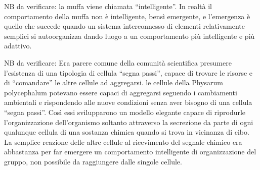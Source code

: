 NB da verificare: la muffa viene chiamata “intelligente”. In realtà il comportamento della muffa non è intelligente, bensì emergente, e l’emergenza è quello che succede quando un sistema interconnesso di elementi relativamente semplici si autoorganizza dando luogo a un comportamento più intelligente e più adattivo.

NB da verificare: Era parere comune della comunità scientifica presumere l’esistenza di una tipologia di cellula “segna passi”, capace di trovare le risorse e di “comandare” le altre cellule ad aggregarsi. le cellule della Physarum polycephalum potevano essere capaci di aggregarsi seguendo i cambiamenti ambientali e rispondendo alle nuove condizioni senza aver bisogno di una cellula “segna passi”. Così essi svilupparono un modello elegante capace di riprodurle l’organizzazione dell’organismo soltanto attraverso la secrezione da parte di ogni qualunque cellula di una sostanza chimica quando si trova in vicinanza di cibo. La semplice reazione delle altre cellule al ricevimento del segnale chimico era abbastanza per far emergere un comportamento intelligente di organizzazione del gruppo, non possibile da raggiungere dalle singole cellule. 
